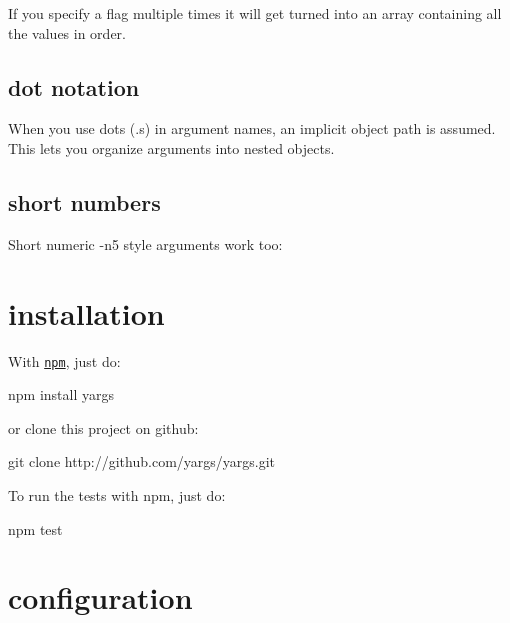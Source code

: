 If you specify a flag multiple times it will get turned into an array containing all the values in order. 


\subsection*{dot notation }

When you use dots ({\ttfamily .}s) in argument names, an implicit object path is assumed. This lets you organize arguments into nested objects. 


\subsection*{short numbers }

Short numeric {\ttfamily -\/n5} style arguments work too\+: 


\section*{installation }

With \href{https://github.com/npm/npm}{\tt npm}, just do\+: \begin{DoxyVerb}npm install yargs
\end{DoxyVerb}


or clone this project on github\+: \begin{DoxyVerb}git clone http://github.com/yargs/yargs.git
\end{DoxyVerb}


To run the tests with npm, just do\+: \begin{DoxyVerb}npm test
\end{DoxyVerb}


\section*{configuration }

